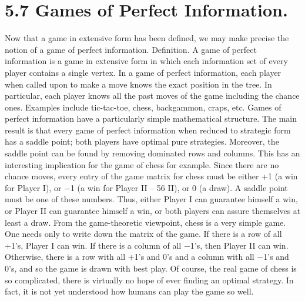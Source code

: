 \section{5.7 Games of Perfect Information.} Now that a game in extensive form has been
defined, we may make precise the notion of a game of perfect information.
Definition. A game of perfect information is a game in extensive form in which each
information set of every player contains a single vertex.
In a game of perfect information, each player when called upon to make a move knows
the exact position in the tree. In particular, each player knows all the past moves of the
game including the chance ones. Examples include tic-tac-toe, chess, backgammon, craps,
etc.
Games of perfect information have a particularly simple mathematical structure. The
main result is that every game of perfect information when reduced to strategic form has
a saddle point; both players have optimal pure strategies. Moreover, the saddle point can
be found by removing dominated rows and columns. This has an interesting implication
for the game of chess for example. Since there are no chance moves, every entry of the
game matrix for chess must be either +1 (a win for Player I), or −1 (a win for Player
II – 56
II), or 0 (a draw). A saddle point must be one of these numbers. Thus, either Player
I can guarantee himself a win, or Player II can guarantee himself a win, or both players
can assure themselves at least a draw. From the game-theoretic viewpoint, chess is a very
simple game. One needs only to write down the matrix of the game. If there is a row of all
+1’s, Player I can win. If there is a column of all −1’s, then Player II can win. Otherwise,
there is a row with all +1’s and 0’s and a column with all −1’s and 0’s, and so the game is
drawn with best play. Of course, the real game of chess is so complicated, there is virtually
no hope of ever finding an optimal strategy. In fact, it is not yet understood how humans
can play the game so well.
